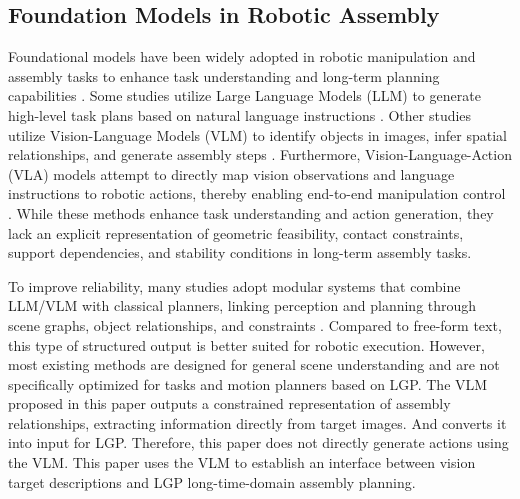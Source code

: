 \documentclass[letterpaper, 10 pt, conference]{ieeeconf}  %
\begin{document}
\subsection{Foundation Models in Robotic Assembly}
Foundational models have been widely adopted in robotic manipulation and assembly tasks to enhance task understanding and long-term planning capabilities \cite{11495231}.
Some studies utilize Large Language Models (LLM) to generate high-level task plans based on natural language instructions \cite{11296887}.
Other studies utilize Vision-Language Models (VLM) to identify objects in images, infer spatial relationships, and generate assembly steps \cite{11373776, 11264491, 11370194, 10990233}.
Furthermore, Vision-Language-Action (VLA) models attempt to directly map vision observations and language instructions to robotic actions, thereby enabling end-to-end manipulation control \cite{11520663, 10900471, 11640725}.
While these methods enhance task understanding and action generation, they lack an explicit representation of geometric feasibility, contact constraints, support dependencies, and stability conditions in long-term assembly tasks.

To improve reliability, many studies adopt modular systems that combine LLM/VLM with classical planners, linking perception and planning through scene graphs, object relationships, and constraints \cite{11328873}.
Compared to free-form text, this type of structured output is better suited for robotic execution.
However, most existing methods are designed for general scene understanding and are not specifically optimized for tasks and motion planners based on LGP.
The VLM proposed in this paper outputs a constrained representation of assembly relationships, extracting information directly from target images.
And converts it into input for LGP.
Therefore, this paper does not directly generate actions using the VLM.
This paper uses the VLM to establish an interface between vision target descriptions and LGP long-time-domain assembly planning.



\end{document}
